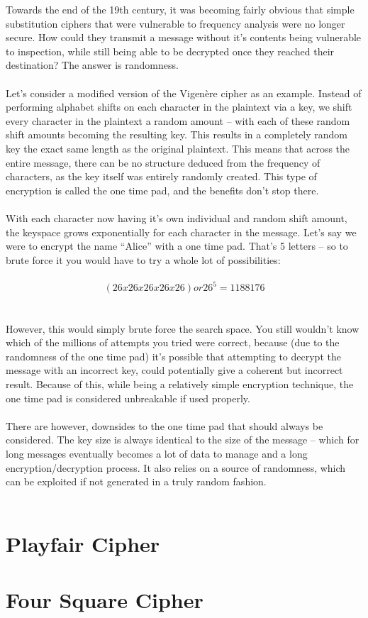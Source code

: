 \documentclass[11pt]{article}
\begin{document}
Towards the end of the 19th century, it was becoming fairly obvious that simple substitution ciphers that were vulnerable to frequency analysis were no longer secure. How could they transmit a message without it’s contents being vulnerable to inspection, while still being able to be decrypted once they reached their destination? The answer is randomness.
\\
\\
Let’s consider a modified version of the Vigenère cipher as an example. Instead of performing alphabet shifts on each character in the plaintext via a key, we shift every character in the plaintext a random amount – with each of these random shift amounts becoming the resulting key. This results in a completely random key the exact same length as the original plaintext. This means that across the entire message, there can be no structure deduced from the frequency of characters, as the key itself was entirely randomly created. This type of encryption is called the one time pad, and the benefits don’t stop there.
\\
\\
With each character now having it’s own individual and random shift amount, the keyspace grows exponentially for each character in the message. Let’s say we were to encrypt the name “Alice” with a one time pad. That’s 5 letters – so to brute force it you would have to try a whole lot of possibilities:
\\
\\
$$(26x26x26x26x26) or 26^5 = 1188176$$
\\
\\
However, this would simply brute force the search space. You still wouldn't know which of the millions of attempts you tried were correct, because (due to the randomness of the one time pad) it's possible that attempting to decrypt the message with an incorrect key, could potentially give a coherent but incorrect result. Because of this, while being a relatively simple encryption technique, the one time pad is considered unbreakable if used properly.
\\
\\
There are however, downsides to the one time pad that should always be considered. The key size is always identical to the size of the message – which for long messages eventually becomes a lot of data to manage and a long encryption/decryption process. It also relies on a source of randomness, which can be exploited if not generated in a truly random fashion.
\\
\\
\section{Playfair Cipher}

\section{Four Square Cipher}
\end{document}
